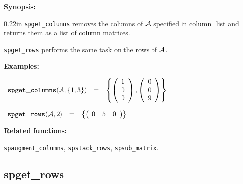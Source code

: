{\bf Synopsis:} %

\begin{addtolength}{\leftskip}{0.22in}
{\tt spget\_columns} removes the columns of ${\cal A}$ specified in 
                column\_list and returns them as a list of column 
                matrices. 

\end{addtolength}
\hspace*{0.175in} {\tt spget\_rows} performs the same task on the rows of 
                ${\cal A}$. 

{\bf Examples:}

\begin{flushleft}  
\hspace*{0.1in}
\begin{math}  
\begin{array}{ccc}
{\tt spget\_columns}({\cal A},\{1,3\}) & = & 
\left\{ 
        \left( \begin{array}{c} 1 \\ 0 \\ 0 \end{array} \right),
        \left( \begin{array}{c} 0 \\ 0 \\ 9 \end{array} \right) 
\right\} 
\end{array}
\end{math}  
\end{flushleft}

\vspace*{0.1in}

\begin{flushleft}  
\hspace*{0.1in}
\begin{math}  
\begin{array}{ccc}
{\tt spget\_rows}({\cal A},2) & = & 
\left\{ 
        \left( \begin{array}{ccc} 0 & 5 & 0 \end{array} \right)
\right\} 
\end{array}
\end{math}  
\end{flushleft}

{\bf Related functions:}

\hspace*{0.175in} {\tt spaugment\_columns}, {\tt spstack\_rows}, 
{\tt spsub\_matrix}.


\subsection{spget\_rows}

